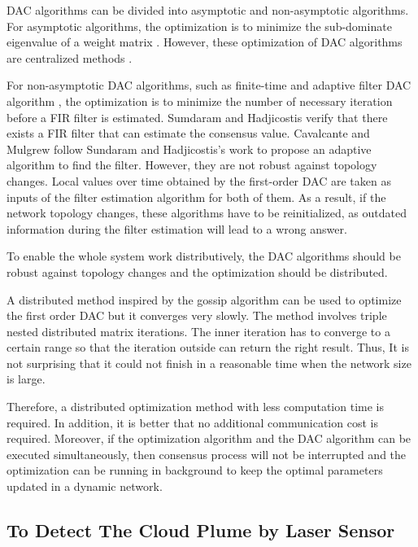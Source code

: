 DAC algorithms can be divided into asymptotic and non-asymptotic algorithms.
For asymptotic algorithms, the optimization is to minimize the sub-dominate
eigenvalue of a weight matrix \cite{Asensio-Marco2012}\cite{Xiao2004}\cite{Xiong2010}.
 However, these optimization of DAC algorithms are centralized methods
. 

For non-asymptotic DAC algorithms, such as finite-time \cite{Sundaram2007}
and adaptive filter DAC algorithm \cite{Cavalcante2010}, the optimization
is to minimize the number of necessary iteration before a FIR filter
is estimated. Sumdaram and Hadjicostis \cite{Sundaram2007} verify
that there exists a FIR filter that can estimate the consensus value.
Cavalcante and Mulgrew \cite{Cavalcante2010} follow Sundaram and
Hadjicostis's work to propose an adaptive algorithm to find the filter.
However, they are not robust against topology changes.   Local values
over time obtained by the first-order DAC are taken as inputs of the
filter estimation algorithm for both of them. As a result, if the
network topology changes, these algorithms have to be reinitialized,
as outdated information during the filter estimation will lead to
a wrong answer.

To enable the whole system work distributively, the DAC algorithms
should be robust against topology changes and the optimization should
be distributed. 

A distributed method inspired by the gossip algorithm \cite{Boyd2006}
can be used to optimize the first order DAC but it converges very
slowly. The method involves triple nested distributed matrix iterations.
The inner iteration has to converge to a certain range so that the
iteration outside can return the right result. Thus, It is not surprising
that it could not finish in a reasonable time when the network size
is large. 

Therefore, a distributed optimization method with less computation
time is required. In addition, it is better that no additional communication
cost is required. Moreover, if the optimization algorithm and the
DAC algorithm can be executed simultaneously, then consensus process
will not be interrupted and the optimization can be running in background
to keep the optimal parameters updated in a dynamic network. 


\subsection{To Detect The Cloud Plume by Laser Sensor}

